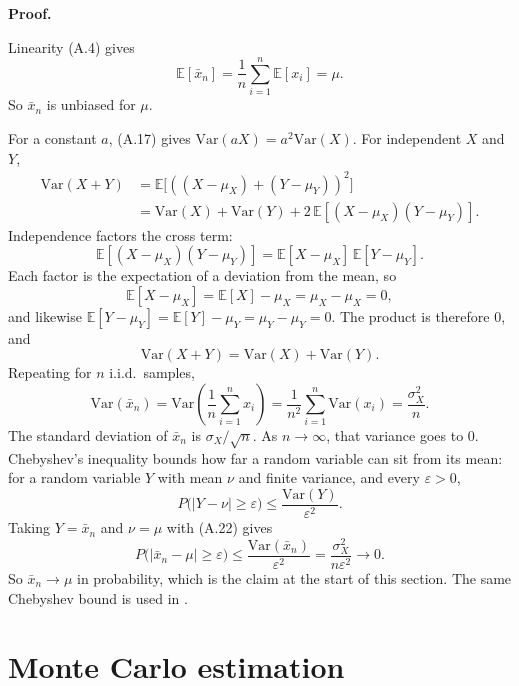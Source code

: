 \textbf{Proof.}

Linearity (A.4) gives
\begin{equation}
\mathbb{E}[\bar{x}_n]
=
\frac{1}{n}\sum_{i=1}^{n} \mathbb{E}[x_i]
=
\mu.
\tag{A.21}\label{eq:A.21}
\end{equation}
So $\bar{x}_n$ is unbiased for $\mu$.

For a constant $a$, (A.17) gives $\mathrm{Var}(aX)=a^2\mathrm{Var}(X)$. For independent $X$ and $Y$,
\[
\begin{aligned}
\mathrm{Var}(X+Y)
&=
\mathbb{E}\bigl[((X-\mu_X)+(Y-\mu_Y))^2\bigr]
\\
&=
\mathrm{Var}(X)+\mathrm{Var}(Y)+2\,\mathbb{E}[(X-\mu_X)(Y-\mu_Y)].
\end{aligned}
\]
Independence factors the cross term:
\[
\mathbb{E}[(X-\mu_X)(Y-\mu_Y)]
=
\mathbb{E}[X-\mu_X]\,\mathbb{E}[Y-\mu_Y].
\]
Each factor is the expectation of a deviation from the mean, so
\[
\mathbb{E}[X-\mu_X]
=
\mathbb{E}[X]-\mu_X
=
\mu_X-\mu_X
=
0,
\]
and likewise $\mathbb{E}[Y-\mu_Y]=\mathbb{E}[Y]-\mu_Y=\mu_Y-\mu_Y=0$. The product is therefore $0$, and
\[
\mathrm{Var}(X+Y)=\mathrm{Var}(X)+\mathrm{Var}(Y).
\]
Repeating for $n$ i.i.d.\ samples,
\begin{equation}
\mathrm{Var}(\bar{x}_n)
=
\mathrm{Var}\!\left(\frac{1}{n}\sum_{i=1}^{n} x_i\right)
=
\frac{1}{n^2}\sum_{i=1}^{n} \mathrm{Var}(x_i)
=
\frac{\sigma_X^2}{n}.
\tag{A.22}\label{eq:A.22}
\end{equation}
The standard deviation of $\bar{x}_n$ is $\sigma_X/\sqrt{n}$. As $n\to\infty$, that variance goes to $0$. Chebyshev's inequality bounds how far a random variable can sit from its mean: for a random variable $Y$ with mean $\nu$ and finite variance, and every $\varepsilon>0$,
\[
P\bigl(|Y-\nu|\ge\varepsilon\bigr)
\le
\frac{\mathrm{Var}(Y)}{\varepsilon^2}.
\]
Taking $Y=\bar{x}_n$ and $\nu=\mu$ with (A.22) gives
\begin{equation}
P\bigl(|\bar{x}_n-\mu|\ge\varepsilon\bigr)
\le
\frac{\mathrm{Var}(\bar{x}_n)}{\varepsilon^2}
=
\frac{\sigma_X^2}{n\varepsilon^2}
\to 0.
\tag{A.23}\label{eq:A.23}
\end{equation}
So $\bar{x}_n\to\mu$ in probability, which is the claim at the start of this section. The same Chebyshev bound is used in .

\section{Monte Carlo estimation}\label{app:A.4}

